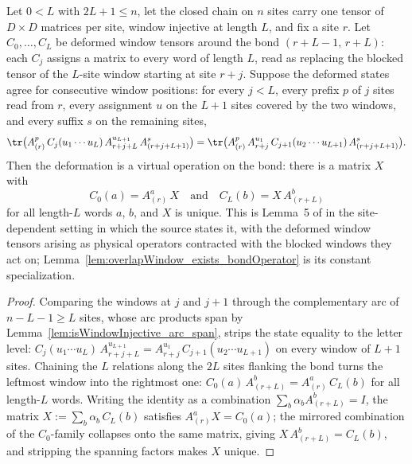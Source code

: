 \begin{lemma}%
    \label{lem:chain_overlapWindow_exists_bondOperator}
    \leanok
    Let $0 < L$ with $2L + 1 \le n$, let the closed chain on $n$ sites
    carry one tensor of $D \times D$ matrices per site, window injective
    at length $L$, and fix a site $r$.  Let $C_0, \ldots, C_L$ be deformed
    window tensors around the bond $(r+L-1,\, r+L)$: each $C_j$ assigns a
    matrix to every word of length $L$, read as replacing the blocked
    tensor of the $L$-site window starting at site $r + j$.  Suppose the
    deformed states agree for consecutive window positions: for every
    $j < L$, every prefix $p$ of $j$ sites read from $r$, every assignment
    $u$ on the $L + 1$ sites covered by the two windows, and every suffix
    $s$ on the remaining sites,
    \[
        \tr\bigl(A_{(r)}^{p}\, C_j(u_1 \cdots u_L)\,
        A_{r+j+L}^{u_{L+1}}\, A_{(r+j+L+1)}^{s}\bigr)
        = \tr\bigl(A_{(r)}^{p}\, A_{r+j}^{u_1}\,
        C_{j+1}(u_2 \cdots u_{L+1})\, A_{(r+j+L+1)}^{s}\bigr).
    \]
    Then the deformation is a virtual operation on the bond: there is a
    matrix $X$ with
    \[
        C_0(a) = A_{(r)}^{a}\, X
        \quad\text{and}\quad
        C_L(b) = X\, A_{(r+L)}^{b}
    \]
    for all length-$L$ words $a$, $b$, and $X$ is unique.  This is
    Lemma~5 of \cite{Molnar2018NormalPEPS} in the site-dependent setting
    in which the source states it, with the deformed window tensors
    arising as physical operators contracted with the blocked windows
    they act on; Lemma~\ref{lem:overlapWindow_exists_bondOperator} is its
    constant specialization.
\end{lemma}
\begin{proof}\leanok
    Comparing the windows at $j$ and $j + 1$ through the complementary
    arc of $n - L - 1 \ge L$ sites, whose arc products span by
    Lemma~\ref{lem:isWindowInjective_arc_span}, strips the state equality
    to the letter level:
    $C_j(u_1 \cdots u_L)\,A_{r+j+L}^{u_{L+1}} =
        A_{r+j}^{u_1}\,C_{j+1}(u_2 \cdots u_{L+1})$ on every window of
    $L + 1$ sites.  Chaining the $L$ relations along the $2L$ sites
    flanking the bond turns the leftmost window into the rightmost one:
    $C_0(a)\,A_{(r+L)}^{b} = A_{(r)}^{a}\,C_L(b)$ for all length-$L$
    words.  Writing the identity as a combination
    $\sum_b \alpha_b A_{(r+L)}^{b} = I$, the matrix
    $X := \sum_b \alpha_b\,C_L(b)$ satisfies $A_{(r)}^{a} X = C_0(a)$;
    the mirrored combination of the $C_0$-family collapses onto the same
    matrix, giving $X\,A_{(r+L)}^{b} = C_L(b)$, and stripping the
    spanning factors makes $X$ unique.
\end{proof}

